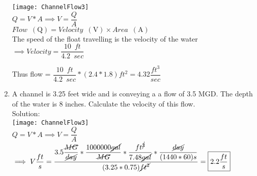 \begin{enumerate}
  \vspace{0.2cm}
\texttt{[image: ChannelFlow3]}\\
$Q=V*A \implies V=\dfrac{Q}{A}$\\
\vspace{0.3cm}
  $Flow \enspace(\mathrm{Q})= Velocity \enspace(\mathrm{V})  \times Area \enspace(\mathrm{A})$\\

The speed of the float travelling is the velocity of the water $\implies Velocity = \dfrac{10 \enspace ft}{4.2 \enspace sec}$

Thus flow = $\dfrac{10 \enspace ft}{4.2 \enspace sec} * (2.4*1.8) ft^2 = \boxed{4.32 \dfrac{ft^3}{sec}} $\\

\vspace{0.2cm}

\item A channel is 3.25 feet wide and is conveying a a flow of 3.5 MGD. The depth of the water is 8 inches. Calculate the velocity of this flow.\\
Solution:\\
\vspace{0.2cm}
\texttt{[image: ChannelFlow3]}\\
$Q=V*A \implies V=\dfrac{Q}{A}$\\
\vspace{0.3cm}
$\implies V\dfrac{ft}{s}=\dfrac{3.5\dfrac{\cancel{MG}}{\cancel{day}}*\dfrac{1000000\cancel{gal}}{\cancel{MG}}*\dfrac{ft^{\cancel{3}}}{7.48\cancel{gal}}*\dfrac{\cancel{day}}{(1440*60)s}}{(3.25*0.75)\cancel{ft^2}}=\boxed{2.2\dfrac{ft}{s}}$

\end{enumerate}
